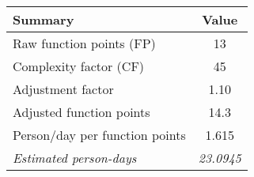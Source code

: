 \begin{tabular}{l|c}
\textbf{Summary} & \textbf{Value} \\ \hline
Raw function points (FP) & 13 \\
Complexity factor (CF) & 45 \\
Adjustment factor & 1.10 \\
Adjusted function points & 14.3 \\
Person/day per function points & 1.615 \\ \hline
\textit{Estimated person-days} & \textit{23.0945}
\end{tabular}
